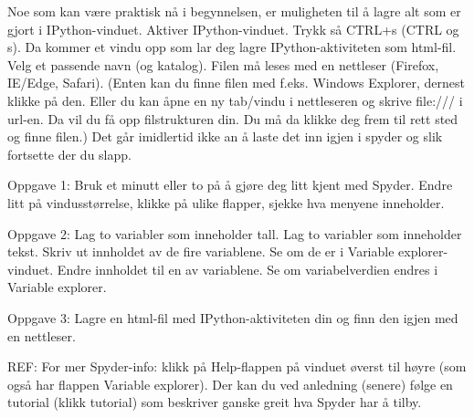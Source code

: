 Noe som kan være praktisk nå i begynnelsen, er muligheten til å lagre alt
som er gjort i IPython-vinduet. 
Aktiver IPython-vinduet. Trykk så CTRL+s (CTRL og s).
Da kommer et vindu opp som lar deg lagre IPython-aktiviteten som html-fil.
Velg et passende navn (og katalog).
Filen må leses med en nettleser (Firefox, IE/Edge, Safari).
(Enten kan du finne filen med f.eks. Windows Explorer, dernest klikke på den. 
Eller du kan åpne en ny tab/vindu i nettleseren og skrive file:/// i url-en.
Da vil du få opp filstrukturen din. Du må da klikke deg frem til rett sted og finne filen.)
Det går imidlertid ikke an å laste det inn igjen i spyder og slik fortsette der du slapp. 


Oppgave 1:
Bruk et minutt eller to på å gjøre deg litt kjent med Spyder.
Endre litt på vindusstørrelse, klikke på ulike flapper, sjekke hva menyene inneholder. 

Oppgave 2:
Lag to variabler som inneholder tall. Lag to variabler som inneholder tekst.
Skriv ut innholdet av de fire variablene. Se om de er i Variable explorer-vinduet.
Endre innholdet til en av variablene. Se om variabelverdien endres i Variable explorer.

Oppgave 3:
Lagre en html-fil med IPython-aktiviteten din og finn den igjen med en nettleser. 


REF: For mer Spyder-info: klikk på Help-flappen på vinduet øverst til høyre
(som også har flappen Variable explorer).
Der kan du ved anledning (senere) følge en tutorial (klikk tutorial)
som beskriver ganske greit hva Spyder har å tilby.


\fi